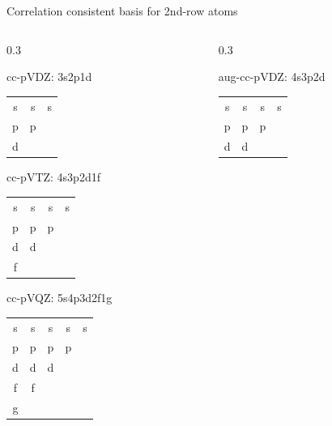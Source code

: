 \documentclass[aspectratio=169,9pt]{beamer}
\newcommand{\red}[1]{\textcolor{hfRed}{#1}}
\newcommand{\green}[1]{\textcolor{hfGreen}{#1}}
\newcommand{\blue}[1]{\textcolor{hfBlue}{#1}}
\newcommand{\violet}[1]{\textcolor{hfViolet}{#1}}
\begin{document}
\begin{frame}{Correlation consistent basis for 2nd-row atoms}
\small
	\begin{columns}
		\begin{column}{0.3\textwidth}
        	\begin{block}{cc-pVDZ: \small 3s2p1d}
        		\begin{tabular}{ccc}
        			\green{s} & \green{s} & \green{s} \\
        			\green{p} & \green{p} \\
        			\green{d} \\
        		\end{tabular}
        	\end{block}
        	\begin{block}{cc-pVTZ: \small 4s3p2d1f}
        		\begin{tabular}{cccc}
        			\green{s} & \green{s} & \green{s} & \blue{s} \\
        			\green{p} & \green{p} & \blue{p} \\
        			\green{d} & \blue{d} \\
        			\blue{f}  \\
        		\end{tabular}
        	\end{block}
        	\begin{block}{cc-pVQZ: \small 5s4p3d2f1g}
        		\begin{tabular}{ccccc}
        			\green{s} & \green{s} & \green{s} & \blue{s} & \violet{s} \\
        			\green{p} & \green{p} & \blue{p} & \violet{p} \\
        			\green{d} & \blue{d} & \violet{d} \\
        			\blue{f} & \violet{f} \\
        			\violet{g} \\
        		\end{tabular}
        	\end{block}
		\end{column}
		\begin{column}{0.3\textwidth}
        	\begin{block}{\red{aug}-cc-pVDZ: \small 4s3p2d}
        		\begin{tabular}{cccc}
        			\green{s} & \green{s} & \green{s} & \red{s} \\
        			\green{p} & \green{p} & \red{p} \\
        			\green{d} & \red{d} \\

\end{tabular}
\end{block}
\end{column}
\end{columns}
\end{frame}
\end{document}
